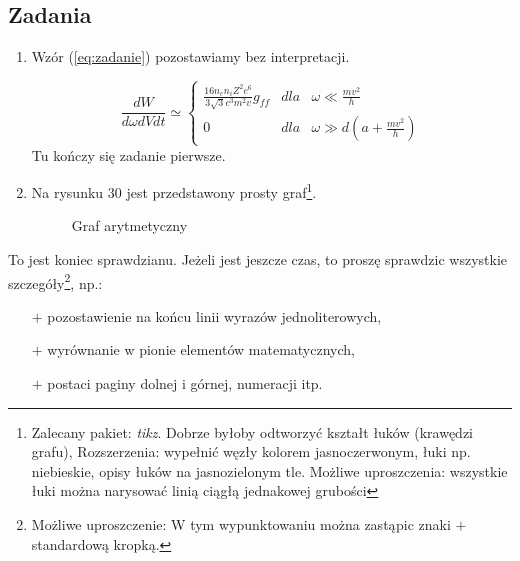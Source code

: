 \documentclass[a4paper, 11pt]{article}
\begin{document}
\subsection{Zadania}
\begin{enumerate}
\item Wzór (\ref{eq:zadanie}) pozostawiamy bez interpretacji.

\begin{equation}
\label{eq:zadanie}
\frac{dW}{d\omega dVdt} \simeq \left\{
\begin{array}{rcl}
\frac{16n_en_iZ^2e^6}{3\sqrt{3}c^3m^2v}g_{ff} & dla &\omega \ll \frac{mv^2}{h} \\
0 & dla & \omega \gg d(a+\frac{mv^2}{h})
\end{array}\right.
\end{equation}
Tu kończy się zadanie pierwsze.

\item
Na rysunku 30 jest przedstawony prosty graf\footnote{Zalecany pakiet: {\em tikz}. Dobrze byłoby odtworzyć kształt łuków (krawędzi grafu), Rozszerzenia: wypełnić węzły kolorem jasnoczerwonym, łuki np. niebieskie, opisy łuków na jasnozielonym tle. Możliwe uproszczenia: wszystkie łuki można narysować linią ciągłą jednakowej grubości}.

\begin{figure}[!ht]
\caption{Graf arytmetyczny}
\label{fig:graf}
\begin{center}
\end{center}
\end{figure}
\end{enumerate}

To jest koniec sprawdzianu. Jeżeli jest jeszcze czas, to proszę sprawdzic wszystkie szczegóły\footnote{Możliwe uproszczenie: W tym wypunktowaniu można zastąpic znaki $+$ standardową kropką.}, np.:
\begin{itemize}
\item[$+$] pozostawienie na końcu linii wyrazów jednoliterowych,
\item[$+$] wyrównanie w pionie elementów matematycznych,
\item[$+$] postaci paginy dolnej i górnej, numeracji itp.
\end{itemize}
\end{document}
